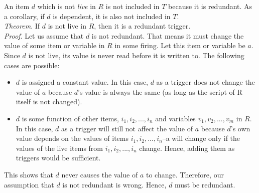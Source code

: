 \documentclass{sig-alternate-05-2015}
\begin{document}
\begin{enumerate}
An item $d$ which is not \textit{live} in $R$ is not included in $T$ because it is redundant. As a corollary, if $d$ is dependent, it is also not included in $T$.\\
\emph{Theorem}. If $d$ is not live in $R$, then it is a redundant trigger.\\
\emph{Proof}. Let us assume that $d$ is not redundant. That means it must change the value of some item or variable in $R$ in some firing. Let this item or variable be $a$. Since $d$ is not live, its value is never read before it is written to. The following cases are possible:
\begin{itemize} [topsep=-2pt, itemsep=-1pt]
\item $d$ is assigned a constant value. In this case, $d$ as a trigger does not change the value of $a$ because $d$'s value is always the same (as long as the script of R  itself is not changed).
\item $d$ is some function of other items, $i_1, i_2, ..., i_n$ and variables $v_1, v_2, ..., v_m$ in $R$. In this case, $d$ as a trigger will still not affect the value of $a$ because $d$'s own value depends on the values of items $i_1, i_2, ..., i_n$--a will change only if the values of the live items from $i_1, i_2, ..., i_n$ change. Hence, adding them as triggers would be sufficient.
\end{itemize}
This shows that $d$ never causes the value of $a$ to change. Therefore, our assumption that $d$ is not redundant is wrong. Hence, $d$ must be redundant. \blacksquare
\end{enumerate}
\end{document}
